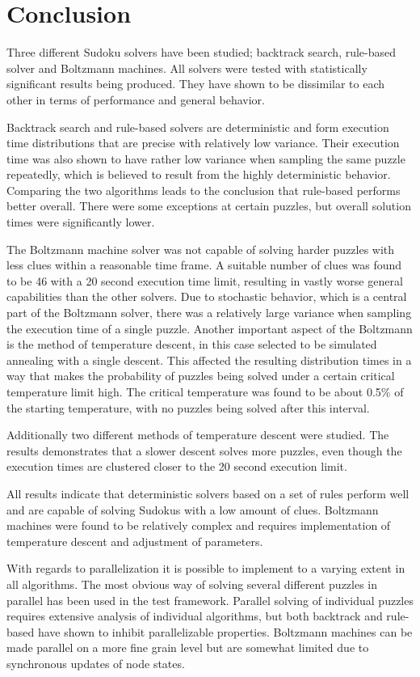 \documentclass[a4paper,11pt]{kth-mag}
\begin{document}
\chapter{Conclusion}
Three different Sudoku solvers have been studied; backtrack search, rule-based solver and Boltzmann machines.
All solvers were tested with statistically significant results being produced.
They have shown to be dissimilar to each other in terms of performance and general behavior.

Backtrack search and rule-based solvers are deterministic and form execution time distributions that are precise with relatively low variance.
Their execution time was also shown to have rather low variance when sampling the same puzzle repeatedly, which is believed to result from the highly deterministic behavior.
Comparing the two algorithms leads to the conclusion that rule-based performs better overall.
There were some exceptions at certain puzzles, but overall solution times were significantly lower.

The Boltzmann machine solver was not capable of solving harder puzzles with less clues within a reasonable time frame.
A suitable number of clues was found to be 46 with a 20 second execution time limit, resulting in vastly worse general capabilities than the other solvers.
Due to stochastic behavior, which is a central part of the Boltzmann solver, there was a relatively large variance when sampling the execution time of a single puzzle.
Another important aspect of the Boltzmann is the method of temperature descent, in this case selected to be simulated annealing with a single descent.
This affected the resulting distribution times in a way that makes the probability of puzzles being solved under a certain critical temperature limit high.
The critical temperature was found to be about 0.5\% of the starting temperature, with no puzzles being solved after this interval.

Additionally two different methods of temperature descent were studied.
The results demonstrates that a slower descent solves more puzzles, even though the execution times are clustered closer to the 20 second execution limit.

All results indicate that deterministic solvers based on a set of rules perform well and are capable of solving Sudokus with a low amount of clues.
Boltzmann machines were found to be relatively complex and requires implementation of temperature descent and adjustment of parameters.

With regards to parallelization it is possible to implement to a varying extent in all algorithms.
The most obvious way of solving several different puzzles in parallel has been used in the test framework.
Parallel solving of individual puzzles requires extensive analysis of individual algorithms, but both backtrack and rule-based have shown to inhibit parallelizable properties.
Boltzmann machines can be made parallel on a more fine grain level but are somewhat limited due to synchronous updates of node states.
\end{document}
